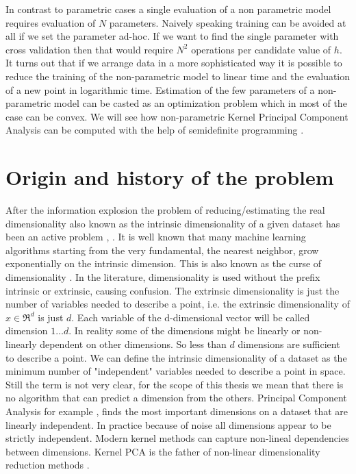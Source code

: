 \documentclass[12pt,letterpaper,doublespaced,ETD,dvips,proposal]{gtthesis}
\begin{document}
\begin{Body}

In contrast to parametric cases a single evaluation of a non
parametric model requires evaluation of $N$ parameters. Naively
speaking training can be avoided at all if we set the parameter
ad-hoc. If we want to find the single parameter with cross
validation then that would require $N^2$ operations per candidate
value of $h$. It turns out that if we arrange data in a more sophisticated way
it is possible to reduce the training of the non-parametric model to
linear time and the evaluation of a new point in logarithmic time.
Estimation of the few parameters of a non-parametric model can be
casted as an optimization problem which in most of the case can be
convex. We will see how non-parametric Kernel Principal Component 
Analysis \cite{scholkopf1998nca} can be computed with the help 
of semidefinite programming \cite{vandenberghe1996sp, boyd2004co}.

\section{Origin and history of the problem}
\label{origin}

After the information explosion the problem of reducing/estimating
the real dimensionality also known as the intrinsic dimensionality of a
given dataset has been an active problem \cite{kegl2003ide}, \cite{costa2003egm}. 
It is well known that many
machine learning algorithms starting from the very fundamental, the
nearest neighbor, grow exponentially on the intrinsic dimension. This
is also known as the curse of dimensionality \cite{donoho2000hdd}.
In the literature, dimensionality is used without the prefix intrinsic or
extrinsic, causing confusion. The extrinsic dimensionality is just
the number of variables needed to describe a point, i.e. the
extrinsic dimensionality of $x\in \Re^d$ is just $d$. Each variable
of the d-dimensional vector will be called dimension $1\dots d$. In
reality some of the dimensions might be linearly or non-linearly
dependent on other dimensions. So less than $d$ dimensions are
sufficient to describe a point. We can define the intrinsic
dimensionality of a dataset as the minimum number of "independent"
variables needed to describe a point in space. Still the term is not
very clear, for the scope of this thesis we mean that there is no
algorithm that can predict a dimension from the others. Principal
Component Analysis for example \cite{jolliffe2002pca}, finds the most important dimensions
on a dataset that are linearly independent. In practice because of
noise all dimensions appear to be strictly independent.  Modern
kernel methods can capture non-lineal dependencies between
dimensions. Kernel PCA is the father of non-linear dimensionality
reduction methods \cite{scholkopf2002lks}.


\end{Body}
\end{document}

